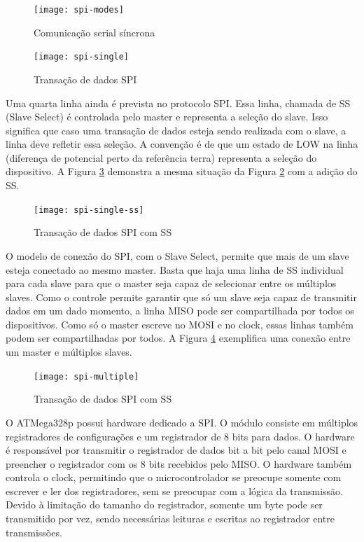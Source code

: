 \documentclass[11pt]{article}
\begin{document}
\begin{figure}
    \centering
    \texttt{[image: spi-modes]}
    \caption{Comunicação serial síncrona}
    \label{figspimodes}
\end{figure}
\begin{figure}
    \centering
    \texttt{[image: spi-single]}
    \caption{Transação de dados SPI}
    \label{figspisingle}
\end{figure}
\par Uma quarta linha ainda é prevista no protocolo SPI. Essa linha, chamada de SS (Slave Select) é controlada pelo master e representa a seleção do slave. Isso significa que caso uma transação de dados esteja sendo realizada com o slave, a linha deve refletir essa seleção. A convenção é de que um estado de LOW na linha (diferença de potencial perto da referência terra) representa a seleção do dispositivo. A Figura \ref{figspisingless} demonstra a mesma situação da Figura \ref{figspisingle} com a adição do SS.
\begin{figure}
    \centering
    \texttt{[image: spi-single-ss]}
    \caption{Transação de dados SPI com SS}
    \label{figspisingless}
\end{figure}
\par O modelo de conexão do SPI, com o Slave Select, permite que mais de um slave esteja conectado ao mesmo master. Basta que haja uma linha de SS individual para cada slave para que o master seja capaz de selecionar entre os múltiplos slaves. Como o controle permite garantir que só um slave seja capaz de transmitir dados em um dado momento, a linha MISO pode ser compartilhada por todos os dispositivos. Como só o master escreve no MOSI e no clock, essas linhas também podem ser compartilhadas por todos. A Figura \ref{figspimultiple} exemplifica uma conexão entre um master e múltiplos slaves.
\begin{figure}
    \centering
    \texttt{[image: spi-multiple]}
    \caption{Transação de dados SPI com SS}
    \label{figspimultiple}
\end{figure}
\par O ATMega328p possui hardware dedicado a SPI. O módulo consiste em múltiplos registradores de configurações e um registrador de 8 bits para dados. O hardware é responsável por transmitir o registrador de dados bit a bit pelo canal MOSI e preencher o registrador com os 8 bits recebidos pelo MISO. O hardware também controla o clock, permitindo que o microcontrolador se preocupe somente com escrever e ler dos registradores, sem se preocupar com a lógica da transmissão. Devido à limitação do tamanho do registrador, somente um byte pode ser transmitido por vez, sendo necessárias leituras e escritas ao registrador entre transmissões.
\end{document}
